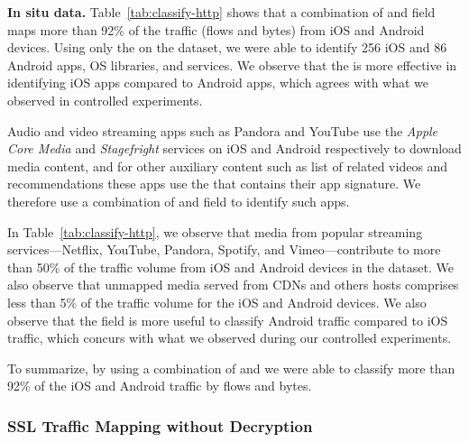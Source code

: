 \textbf{In situ data.}
Table~\ref{tab:classify-http} shows that a combination of \useragent and \httphost field maps more than 92\% of the traffic (flows and bytes) from iOS and Android devices.
Using only the \useragent on the \mobWild dataset, we were able to identify 256 iOS and 86 Android apps, OS libraries, and services. 
We observe that the \useragent is more effective in identifying iOS apps compared to Android apps, which agrees with what we observed in controlled experiments.

Audio and video streaming apps such as Pandora and You\-Tube use the \emph{Apple Core Media} and \emph{Stagefright} services on iOS and Android respectively to download media content, and for other auxiliary content such as list of related videos and recommendations these apps use the \useragent that contains their app signature.
We therefore use a combination of \useragent and \httphost field to identify such apps.

In Table~\ref{tab:classify-http}, we observe that media from popular streaming services---Netflix, YouTube, Pandora, Spotify, and Vimeo---contribute to more than 50\% of the traffic volume from iOS and Android devices in the \mobWild dataset.
We also observe that unmapped media served from CDNs and others hosts comprises less than 5\% of the traffic volume for the iOS and Android devices. 
We also observe that the \httphost field is more useful to classify Android traffic compared to iOS traffic, which concurs with what we observed during our controlled experiments. 

To summarize, by using a combination of \useragent and \httphost we were able to classify more than 92\% of the iOS and Android traffic by flows and bytes. 

\subsubsection{SSL Traffic Mapping without Decryption}

